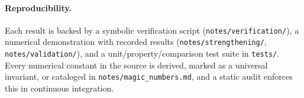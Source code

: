 \documentclass{article}
\newcommand{\code}[1]{\texttt{#1}}
\begin{document}
\paragraph{Reproducibility.} Each result is backed by a symbolic
verification script (\code{notes/verification/}), a numerical
demonstration with recorded results (\code{notes/strengthening/},
\code{notes/validation/}), and a unit/property/comparison test suite in
\code{tests/}. Every numerical constant in the source is derived, marked
as a universal invariant, or cataloged in \code{notes/magic\_numbers.md},
and a static audit enforces this in continuous integration.



\end{document}
